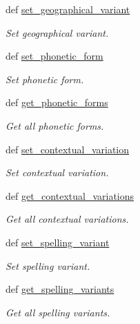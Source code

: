 \begin{DoxyCompactItemize}
def \hyperlink{classlmf_1_1src_1_1core_1_1lexical__entry_1_1_lexical_entry_a931ea014bba9cddfd2e1e9d4cdb1f40a}{set\+\_\+geographical\+\_\+variant}
\begin{DoxyCompactList}\small\item\em Set geographical variant. \end{DoxyCompactList}\item 
def \hyperlink{classlmf_1_1src_1_1core_1_1lexical__entry_1_1_lexical_entry_a475be85222f2a0b4fc6f9e218675fc47}{set\+\_\+phonetic\+\_\+form}
\begin{DoxyCompactList}\small\item\em Set phonetic form. \end{DoxyCompactList}\item 
def \hyperlink{classlmf_1_1src_1_1core_1_1lexical__entry_1_1_lexical_entry_ad341d1cfa5e60593a7bce27a5eec8b98}{get\+\_\+phonetic\+\_\+forms}
\begin{DoxyCompactList}\small\item\em Get all phonetic forms. \end{DoxyCompactList}\item 
def \hyperlink{classlmf_1_1src_1_1core_1_1lexical__entry_1_1_lexical_entry_a2e094703f5eb2e25c5d9c4aabf67ae72}{set\+\_\+contextual\+\_\+variation}
\begin{DoxyCompactList}\small\item\em Set contextual variation. \end{DoxyCompactList}\item 
def \hyperlink{classlmf_1_1src_1_1core_1_1lexical__entry_1_1_lexical_entry_aa2a404954cb0bd85ddfeec53db637dd3}{get\+\_\+contextual\+\_\+variations}
\begin{DoxyCompactList}\small\item\em Get all contextual variations. \end{DoxyCompactList}\item 
def \hyperlink{classlmf_1_1src_1_1core_1_1lexical__entry_1_1_lexical_entry_a091b34e06640680cc167472c519b5c3a}{set\+\_\+spelling\+\_\+variant}
\begin{DoxyCompactList}\small\item\em Set spelling variant. \end{DoxyCompactList}\item 
def \hyperlink{classlmf_1_1src_1_1core_1_1lexical__entry_1_1_lexical_entry_a72701906e798fbc34c6ef6ea177901e8}{get\+\_\+spelling\+\_\+variants}
\begin{DoxyCompactList}\small\item\em Get all spelling variants. \end{DoxyCompactList}\item 

\end{DoxyCompactItemize}
